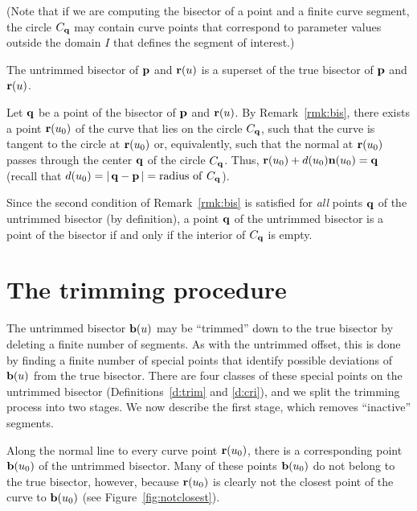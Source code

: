 
(Note that if we are computing the bisector of a point and a finite
curve segment, the circle $C_{\bf q}$ may contain curve points that
correspond to parameter values outside the domain $I$ that defines
the segment of interest.)

\begin{propn}
\label{p:superset}
The untrimmed bisector of ${\bf p}$ and ${\bf r}(u)$ is a superset
of the true bisector of ${\bf p}$ and ${\bf r}(u)$.
\end{propn}
\prf
Let ${\bf q}$ be a point of the bisector of ${\bf p}$ and ${\bf r}(u)$.
By Remark~\ref{rmk:bis}, there exists a point ${\bf r}(u_{0})$ of the
curve that lies on the circle $C_{\bf q}$, such that the curve is tangent
to the circle at ${\bf r}(u_{0})$ or, equivalently, such that the normal
at ${\bf r}(u_{0})$ passes through the center ${\bf q}$ of the circle
$C_{\bf q}$. Thus, ${\bf r}(u_{0}) + d(u_{0}){\bf n}(u_{0}) = {\bf q}$
(recall that $d(u_0)=|\,{\bf q}-{\bf p}\,|={\rm radius\ of\ } C_{\bf q}$).
\QED

Since the second condition of Remark~\ref{rmk:bis} is satisfied for
{\it all\/} points ${\bf q}$ of the untrimmed bisector (by definition),
a point ${\bf q}$ of the untrimmed bisector is a point of the bisector
if and only if the interior of $C_{\bf q}$ is empty.

\section{The trimming procedure}
\label{trimming}

The untrimmed bisector ${\bf b}(u)$ may be ``trimmed'' down to the true
bisector by deleting a finite number of segments. As with the untrimmed
offset, this is done by finding a finite number of special points that
identify possible deviations of ${\bf b}(u)$ from the true bisector.
There are four classes of these special points on the untrimmed bisector
(Definitions~\ref{d:trim} and \ref{d:cri}), and we split the trimming
process into two stages. We now describe the first stage, which removes
``inactive'' segments.

Along the normal line to every curve point ${\bf r}(u_0)$, there is a
corresponding point ${\bf b}(u_0)$ of the untrimmed bisector. Many of
these points ${\bf b}(u_0)$ do not belong to the true bisector, however,
because ${\bf r}(u_0)$ is clearly not the closest point of the curve to
${\bf b}(u_0)$ (see Figure~\ref{fig:notclosest}).

